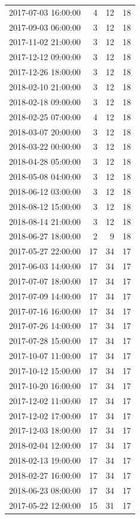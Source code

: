 \begin{tabular}{lrrr}
2017-07-03 16:00:00 & 4 & 12 & 18 \\
2017-09-03 06:00:00 & 3 & 12 & 18 \\
2017-11-02 21:00:00 & 3 & 12 & 18 \\
2017-12-12 09:00:00 & 3 & 12 & 18 \\
2017-12-26 18:00:00 & 3 & 12 & 18 \\
2018-02-10 21:00:00 & 3 & 12 & 18 \\
2018-02-18 09:00:00 & 3 & 12 & 18 \\
2018-02-25 07:00:00 & 4 & 12 & 18 \\
2018-03-07 20:00:00 & 3 & 12 & 18 \\
2018-03-22 00:00:00 & 3 & 12 & 18 \\
2018-04-28 05:00:00 & 3 & 12 & 18 \\
2018-05-08 04:00:00 & 3 & 12 & 18 \\
2018-06-12 03:00:00 & 3 & 12 & 18 \\
2018-08-12 15:00:00 & 3 & 12 & 18 \\
2018-08-14 21:00:00 & 3 & 12 & 18 \\
2018-06-27 18:00:00 & 2 & 9 & 18 \\
2017-05-27 22:00:00 & 17 & 34 & 17 \\
2017-06-03 14:00:00 & 17 & 34 & 17 \\
2017-07-07 18:00:00 & 17 & 34 & 17 \\
2017-07-09 14:00:00 & 17 & 34 & 17 \\
2017-07-16 16:00:00 & 17 & 34 & 17 \\
2017-07-26 14:00:00 & 17 & 34 & 17 \\
2017-07-28 15:00:00 & 17 & 34 & 17 \\
2017-10-07 11:00:00 & 17 & 34 & 17 \\
2017-10-12 15:00:00 & 17 & 34 & 17 \\
2017-10-20 16:00:00 & 17 & 34 & 17 \\
2017-12-02 11:00:00 & 17 & 34 & 17 \\
2017-12-02 17:00:00 & 17 & 34 & 17 \\
2017-12-03 18:00:00 & 17 & 34 & 17 \\
2018-02-04 12:00:00 & 17 & 34 & 17 \\
2018-02-13 19:00:00 & 17 & 34 & 17 \\
2018-02-27 16:00:00 & 17 & 34 & 17 \\
2018-06-23 08:00:00 & 17 & 34 & 17 \\
2017-05-22 12:00:00 & 15 & 31 & 17 \\

\end{tabular}
